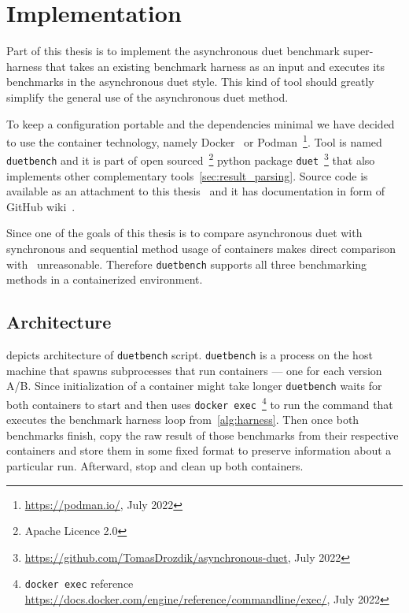 \chapter{Implementation}

Part of this thesis is to implement the asynchronous duet benchmark super-harness that takes an existing benchmark harness as an input and executes its benchmarks in the asynchronous duet style.
This kind of tool should greatly simplify the general use of the asynchronous duet method.

To keep a configuration portable and the dependencies minimal we have decided to use the container technology, namely Docker~\cite{merkel2014docker} or Podman~\footnote{\url{https://podman.io/}, July 2022}.
Tool is named \lstinline{duetbench} and it is part of open sourced~\footnote{Apache Licence 2.0} python package \lstinline{duet}~\footnote{\url{https://github.com/TomasDrozdik/asynchronous-duet}, July 2022} that also implements other complementary tools~\cref{sec:result_parsing}.
Source code is available as an attachment to this thesis~ and it has documentation in form of GitHub wiki~\cite{wiki}.

Since one of the goals of this thesis is to compare asynchronous duet with synchronous and sequential method usage of containers makes direct comparison with~\citet{bulej2020duet} unreasonable.
Therefore \lstinline{duetbench} supports all three benchmarking methods in a containerized environment.

\section{Architecture}

 depicts architecture of \lstinline{duetbench} script.
\lstinline{duetbench} is a process on the host machine that spawns subprocesses that run containers --- one for each version A/B.
Since initialization of a container might take longer \lstinline{duetbench} waits for both containers to start and then uses \lstinline{docker exec}~\footnote{\lstinline{docker exec} reference \url{https://docs.docker.com/engine/reference/commandline/exec/}, July 2022} to run the command that executes the benchmark harness loop from~\cref{alg:harness}.
Then once both benchmarks finish, copy the raw result of those benchmarks from their respective containers and store them in some fixed format to preserve information about a particular run.
Afterward, stop and clean up both containers.

